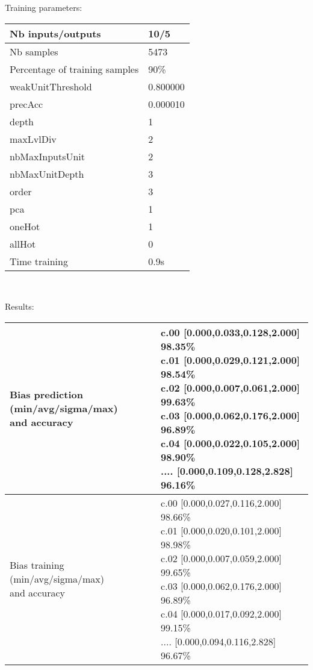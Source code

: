 Training parameters:\\
\begin{center}
\begin{tabular}{|l|l|}
\hline
Nb inputs/outputs&10/5\\
\hline
Nb samples&5473\\
\hline
Percentage of training samples&90\%\\
\hline
weakUnitThreshold&0.800000\\
\hline
precAcc&0.000010\\
\hline
depth&1\\
\hline
maxLvlDiv&2\\
\hline
nbMaxInputsUnit&2\\
\hline
nbMaxUnitDepth&3\\
\hline
order&3\\
\hline
pca&1\\
\hline
oneHot&1\\
\hline
allHot&0\\
\hline
Time training&0.9s\\
\hline
\end{tabular}\\
\end{center}\newline
Results:
\begin{center}
\begin{tabular}{|l|l|}
\hline
\makecell{Bias prediction (min/avg/sigma/max)\\and accuracy}&\makecell{c.00 [0.000,0.033,0.128,2.000] 98.35\%\\
c.01 [0.000,0.029,0.121,2.000] 98.54\%\\
c.02 [0.000,0.007,0.061,2.000] 99.63\%\\
c.03 [0.000,0.062,0.176,2.000] 96.89\%\\
c.04 [0.000,0.022,0.105,2.000] 98.90\%\\
.... [0.000,0.109,0.128,2.828] 96.16\%\\
}\\

\hline
\makecell{Bias training (min/avg/sigma/max)\\and accuracy}&\makecell{c.00 [0.000,0.027,0.116,2.000] 98.66\%\\
c.01 [0.000,0.020,0.101,2.000] 98.98\%\\
c.02 [0.000,0.007,0.059,2.000] 99.65\%\\
c.03 [0.000,0.062,0.176,2.000] 96.89\%\\
c.04 [0.000,0.017,0.092,2.000] 99.15\%\\
.... [0.000,0.094,0.116,2.828] 96.67\%\\
}\\
\hline
\end{tabular}\
\end{center}
